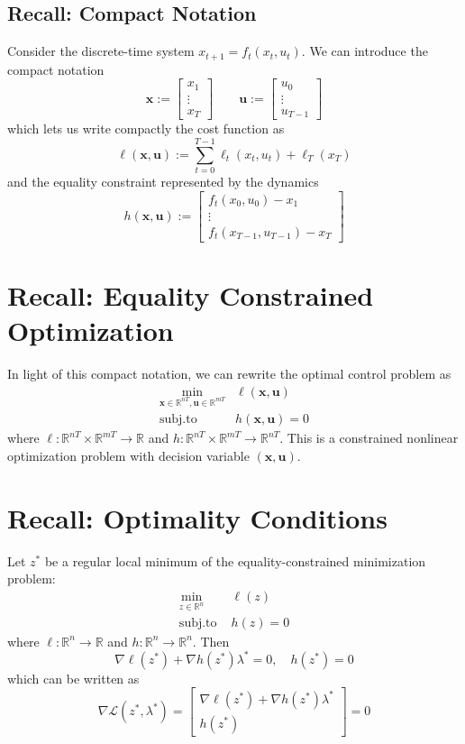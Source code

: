 \documentclass[openany]{book}
\theoremstyle{definition}
\theoremstyle{remark}
\begin{document}
\subsection{Recall: Compact Notation}
Consider the discrete-time system $x_{t+1} = f_t(x_t,u_t)$. We can introduce the compact notation
\[
    \mathbf{x} := \begin{bmatrix}
        x_1 \\ \vdots \\ x_T
    \end{bmatrix} \qquad
    \mathbf{u} := \begin{bmatrix}
        u_0 \\ \vdots \\ u_{T-1}
    \end{bmatrix}
\]
which lets us write compactly the cost function as
\[
    \ell(\mathbf{x},\mathbf{u}) := \sum_{t=0}^{T-1}\ell_t(x_t,u_t)+\ell_T(x_T)
\]
and the equality constraint represented by the dynamics
\[
    h(\mathbf{x},\mathbf{u}) := \begin{bmatrix}
        f_t(x_0,u_0)-x_1 \\
        \vdots \\
        f_t(x_{T-1},u_{T-1})-x_T
    \end{bmatrix}
\]

\section{Recall: Equality Constrained Optimization}
In light of this compact notation, we can rewrite the optimal control problem as
\begin{align*}
    \min_{\mathbf{x}\in\mathbb{R}^{nT},\mathbf{u}\in\mathbb{R}^{mT}} & \ell(\mathbf{x},\mathbf{u})\\
    \text{subj.to } & h(\mathbf{x},\mathbf{u})=0
\end{align*}
where $\ell : \mathbb{R}^{nT} \times \mathbb{R}^{mT} \to \mathbb{R}$ and $h : \mathbb{R}^{nT} \times \mathbb{R}^{mT} \to \mathbb{R}^{nT}$.
This is a constrained nonlinear optimization problem with decision variable $(\mathbf{x},\mathbf{u})$.

\section{Recall: Optimality Conditions}
Let $z^*$ be a regular local minimum of the equality-constrained minimization problem:
\begin{align*}
    \min_{z\in\mathbb{R}^n} & \ell(z)\\
    \text{subj.to } & h(z)=0
\end{align*}
where $\ell : \mathbb{R}^n \to \mathbb{R}$ and $h : \mathbb{R}^n \to \mathbb{R}^n$.
Then
\[
    \nabla\ell(z^*) + \nabla h(z^*)\lambda^* = 0, \quad h(z^*) = 0
\]
which can be written as
\[
    \nabla\mathcal{L}(z^*,\lambda^*) = \begin{bmatrix}
        \nabla\ell(z^*) + \nabla h(z^*)\lambda^* \\
        h(z^*)
    \end{bmatrix} = 0
\]
\end{document}
